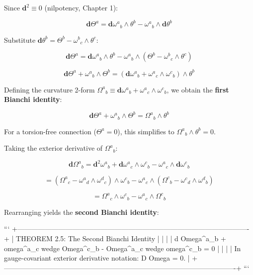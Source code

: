 \documentclass[11pt,twoside,openright]{amsbook}
\begin{document}
{{{{{{Since $\mathbf{d}^2 \equiv 0$ (nilpotency, Chapter 1):

$$\mathbf{d}\Theta^a = \mathbf{d}\omega^a{}_b \wedge \theta^b - \omega^a{}_b \wedge \mathbf{d}\theta^b$$

Substitute $\mathbf{d}\theta^b = \Theta^b - \omega^b{}_c \wedge \theta^c$:

$$\mathbf{d}\Theta^a = \mathbf{d}\omega^a{}_b \wedge \theta^b - \omega^a{}_b \wedge (\Theta^b - \omega^b{}_c \wedge \theta^c)$$

$$\mathbf{d}\Theta^a + \omega^a{}_b \wedge \Theta^b = \left( \mathbf{d}\omega^a{}_b + \omega^a{}_c \wedge \omega^c{}_b \right) \wedge \theta^b$$

Defining the curvature 2-form $\Omega^a{}_b \equiv \mathbf{d}\omega^a{}_b + \omega^a{}_c \wedge \omega^c{}_b$, we obtain the \textbf{first Bianchi identity}:

$$\mathbf{d}\Theta^a + \omega^a{}_b \wedge \Theta^b = \Omega^a{}_b \wedge \theta^b$$

For a torsion-free connection ($\Theta^a = 0$), this simplifies to $\Omega^a{}_b \wedge \theta^b = 0$.

Taking the exterior derivative of $\Omega^a{}_b$:

$$\mathbf{d}\Omega^a{}_b = \mathbf{d}^2 \omega^a{}_b + \mathbf{d}\omega^a{}_c \wedge \omega^c{}_b - \omega^a{}_c \wedge \mathbf{d}\omega^c{}_b$$

$$= (\Omega^a{}_c - \omega^a{}_d \wedge \omega^d{}_c) \wedge \omega^c{}_b - \omega^a{}_c \wedge (\Omega^c{}_b - \omega^c{}_d \wedge \omega^d{}_b)$$

$$= \Omega^a{}_c \wedge \omega^c{}_b - \omega^a{}_c \wedge \Omega^c{}_b$$

Rearranging yields the \textbf{second Bianchi identity}:

```
+----------------------------------------------------------------------------------------------------+
| THEOREM 2.5: The Second Bianchi Identity                                                           |
|                                                                                                    |
|   d Omega^a{}_b + omega^a{}_c wedge Omega^c{}_b - Omega^a{}_c wedge omega^c{}_b = 0                |
|                                                                                                    |
| In gauge-covariant exterior derivative notation: D Omega = 0.                                       |
+----------------------------------------------------------------------------------------------------+
```

}}}}}}
\end{document}
